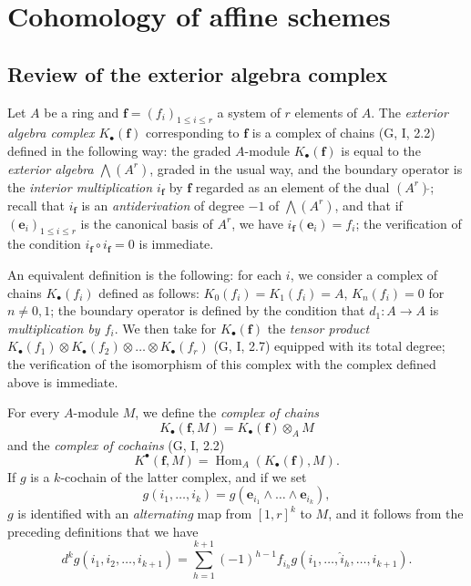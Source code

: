 \section{Cohomology of affine schemes}
\label{section:III.1}

\subsection{Review of the exterior algebra complex}
\label{subsection:III.1.1}

\begin{env}[1.1.1]
\label{III.1.1.1}
Let $A$ be a ring and $\mathbf f=(f_i)_{1\leq i\leq r}$ a system of $r$
elements of $A$. The \emph{exterior algebra complex
$K_\bullet(\mathbf f)$} corresponding to $\mathbf f$ is a complex of chains
(G, I, 2.2) defined in the following way: the graded $A$-module
$K_\bullet(\mathbf f)$ is equal to the \emph{exterior algebra
$\bigwedge(A^r)$}, graded in the usual way, and the boundary operator is the
\emph{interior multiplication $i_{\mathbf f}$} by $\mathbf f$ regarded as
an element of the dual $(A^r)\check{}$; recall that $i_{\mathbf f}$ is an
\emph{antiderivation} of degree $-1$ of $\bigwedge(A^r)$, and that if
$(\mathbf e_i)_{1\leq i\leq r}$ is the canonical basis of $A^r$, we have
$i_{\mathbf f}(\mathbf e_i)=f_i$; the verification of the condition
$i_{\mathbf f}\circ i_{\mathbf f}=0$ is immediate.

An equivalent definition is the following: for each $i$, we consider
a complex of chains $K_\bullet(f_i)$ defined as follows:
$K_0(f_i)=K_1(f_i)=A$, $K_n(f_i)=0$ for $n\neq0,1$; the boundary operator is
defined by the condition that $d_1:A\to A$ is \emph{multiplication by
$f_i$}. We then take for $K_\bullet(\mathbf f)$ the \emph{tensor product
$K_\bullet(f_1)\otimes K_\bullet(f_2)\otimes\ldots\otimes K_\bullet(f_r)$}
(G, I, 2.7) equipped with its total degree; the verification of the
isomorphism of this complex with the complex defined above is immediate.
\end{env}

\begin{env}[1.1.2]
\label{III.1.1.2}
For every $A$-module $M$, we define the \emph{complex of chains}
\begin{equation}
\label{III.1.1.2.1}
\tag{1.1.2.1}
K_\bullet(\mathbf f,M)=K_\bullet(\mathbf f)\otimes_A M
\end{equation}
and the \emph{complex of cochains} (G, I, 2.2)
\begin{equation}
\label{III.1.1.2.2}
\tag{1.1.2.2}
K^\bullet(\mathbf f,M)=\operatorname{Hom}_A(K_\bullet(\mathbf f),M).
\end{equation}
If $g$ is a $k$-cochain of the latter complex, and if we set
\[
g(i_1,\ldots,i_k)=g(\mathbf e_{i_1}\wedge\ldots\wedge\mathbf e_{i_k}),
\]
$g$ is identified with an \emph{alternating} map from $[1,r]^k$ to $M$, and
it follows from the preceding definitions that we have
\begin{equation}
\label{III.1.1.2.3}
\tag{1.1.2.3}
d^kg(i_1,i_2,\ldots,i_{k+1})=
\sum_{h=1}^{k+1}(-1)^{h-1}f_{i_h}
g(i_1,\ldots,\widehat{i}_h,\ldots,i_{k+1}).
\end{equation}
\end{env}


